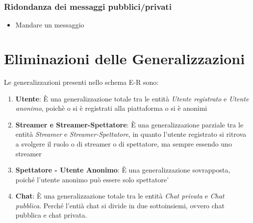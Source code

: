 \subsubsection{Ridondanza dei messaggi pubblici/privati}
\begin{itemize}
    \item Mandare un messaggio
\end{itemize}

\section{Eliminazioni delle Generalizzazioni}
Le generalizzazioni presenti nello schema E-R sono:
\begin{enumerate}
    \item \textbf{Utente}: È una generalizzazione totale tra le entità \textit{Utente registrato} e \textit{Utente anonimo}, poichè o si è registrati alla piattaforma o si è anonimi
    \item \textbf{Streamer e Streamer-Spettatore}: È una generalizzazione parziale tra le entità \textit{Streamer} e \textit{Streamer-Spettatore}, in quanto l'utente registrato si ritrova a svolgere il ruolo o di streamer o di spettatore, ma sempre essendo uno streamer  
    \item \textbf{Spettatore - Utente Anonimo}: È una generalizzazione sovrapposta, poiché l'utente anonimo può essere solo spettatore'
    \item \textbf{Chat}: È una generalizzazione totale tra le entità \textit{Chat privata} e \textit{Chat pubblica}. Perché l'entià chat si divide in due sottoinsiemi, ovvero chat pubblica e chat privata.
\end{enumerate} 
